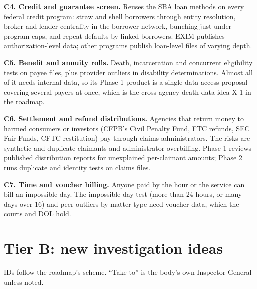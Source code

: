 \documentclass[letterpaper,11pt]{article}
\begin{document}
\textbf{C4. Credit and guarantee screen.} Reuses the SBA loan methods on
every federal credit program: straw and shell borrowers through entity
resolution, broker and lender centrality in the borrower network,
bunching just under program caps, and repeat defaults by linked
borrowers. EXIM publishes authorization-level data; other programs
publish loan-level files of varying depth.

\textbf{C5. Benefit and annuity rolls.} Death, incarceration and
concurrent eligibility tests on payee files, plus provider outliers in
disability determinations. Almost all of it needs internal data, so its
Phase 1 product is a single data-access proposal covering several payers
at once, which is the cross-agency death data idea X-1 in the roadmap.

\textbf{C6. Settlement and refund distributions.} Agencies that return
money to harmed consumers or investors (CFPB's Civil Penalty Fund, FTC
refunds, SEC Fair Funds, CFTC restitution) pay through claims
administrators. The risks are synthetic and duplicate claimants and
administrator overbilling. Phase 1 reviews published distribution
reports for unexplained per-claimant amounts; Phase 2 runs duplicate and
identity tests on claims files.

\textbf{C7. Time and voucher billing.} Anyone paid by the hour or the
service can bill an impossible day. The impossible-day test (more than
24 hours, or many days over 16) and peer outliers by matter type need
voucher data, which the courts and DOL hold.

\hypertarget{tier-b-new-investigation-ideas}{%
\section{Tier B: new investigation
ideas}\label{tier-b-new-investigation-ideas}}

IDs follow the roadmap's scheme. ``Take to'' is the body's own Inspector
General unless noted.
\end{document}
